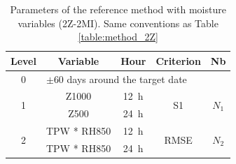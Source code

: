 \documentclass[hess, manuscript]{copernicus}
\begin{document}
	\begin{table}[htb]
		\caption{Parameters of the reference method with moisture variables (2Z-2MI). Same conventions as Table \ref{table:method_2Z}}
		\footnotesize
		\begin{center}
			\begin{tabular}{ccccc}
				\hline 
				Level & Variable & Hour & Criterion & Nb \\ 
				\hline 
				0 & \multicolumn{4}{l}{$\pm 60$ days around the target date} \\
				\hline 
				\multirow{2}{*}{1} & Z1000 & 12~h & \multirow{2}{*}{S1} & \multirow{2}{*}{$N_{1}$} \\
				& Z500 & 24~h & & \\ 
				\hline
				\multirow{2}{*}{2} & TPW * RH850 & 12~h & \multirow{2}{*}{RMSE} & \multirow{2}{*}{$N_{2}$} \\
				& TPW * RH850 & 24~h & & \\ 
				\hline 
			\end{tabular} 
		\end{center}
		\label{table:method_2Z-2MI}
	\end{table}
	
	
	
	
	
	
	
	
	
	
\end{document}
